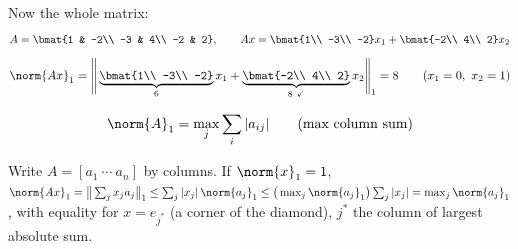 Now the whole matrix:
\[
A = \bmat{1 & -2\\ -3 & 4\\ -2 & 2}, \qquad
Ax = \bmat{1\\ -3\\ -2}x_1 + \bmat{-2\\ 4\\ 2}x_2
\]
\[
\norm{Ax}_1 = \Bigg\|\underbrace{\bmat{1\\ -3\\ -2}}_{6}x_1 + \underbrace{\bmat{-2\\ 4\\ 2}}_{8\ \checkmark}x_2\Bigg\|_1 = 8
\qquad (x_1 = 0,\ x_2 = 1)
\]
\begin{keybox}
\[
\norm{A}_1 = \max_j \sum_i |a_{ij}| \qquad \text{(max column sum)}
\]
\end{keybox}
\begin{insight}
Write $A = [a_1\ \cdots\ a_n]$ by columns. If $\norm{x}_1 = 1$,
$\norm{Ax}_1 = \big\|\sum_j x_j a_j\big\|_1 \le \sum_j |x_j|\,\norm{a_j}_1 \le \big(\max_j\norm{a_j}_1\big)\sum_j|x_j| = \max_j\norm{a_j}_1$,
with equality for $x = e_{j^*}$ (a corner of the diamond), $j^*$ the column of largest absolute sum.
\end{insight}

